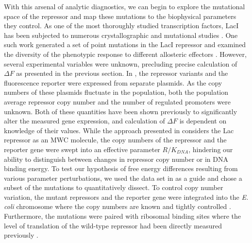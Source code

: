 \documentclass[12pt]{caltech_thesis}
\begin{document}
With this arsenal of analytic diagnostics, we can begin to explore the
mutational space of the repressor and map these mutations to the
biophysical parameters they control. As one of the most thoroughly
studied transcription factors, LacI has been subjected to numerous
crystallographic and mutational studies
\autocite{lewis1996,daber2009a,daber2011}. One such work generated a set
of point mutations in the LacI repressor and examined the diversity of
the phenotypic response to different allosteric effectors
\autocite{daber2011}. However, several experimental variables were
unknown, precluding precise calculation of \(\Delta F\) as presented in
the previous section. In \textcite{daber2011}, the repressor variants
and the fluorescence reporter were expressed from separate plasmids. As
the copy numbers of these plasmids fluctuate in the population, both the
population average repressor copy number and the number of regulated
promoters were unknown. Both of these quantities have been shown
previously to significantly alter the measured gene expression, and
calculation of \(\Delta F\) is dependent on knowledge of their values.
While the approach presented in \textcite{daber2011} considers the Lac
repressor as an MWC molecule, the copy numbers of the repressor and the
reporter gene were swept into an effective parameter \({R / K_{DNA}}\),
hindering our ability to distinguish between changes in repressor copy
number or in DNA binding energy. To test our hypothesis of free energy
differences resulting from various parameter perturbations, we used the
data set in \textcite{daber2011} as a guide and chose a subset of the
mutations to quantitatively dissect. To control copy number variation,
the mutant repressors and the reporter gene were integrated into the
\emph{E. coli} chromosome where the copy numbers are known and tightly
controlled \autocite{razo-mejia2018,garcia2011}. Furthermore, the
mutations were paired with ribosomal binding sites where the level of
translation of the wild-type repressor had been directly measured
previously \autocite{garcia2011}.
\end{document}
